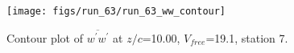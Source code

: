 \begin{figure}[H]
\centering
\texttt{[image: figs/run\_63/run\_63\_ww\_contour]}
\caption{Contour plot of $\overline{w^\prime w^\prime}$ at $z/c$=10.00, $V_{free}$=19.1, station 7.}
\label{fig:run_63_ww_contour}
\end{figure}


